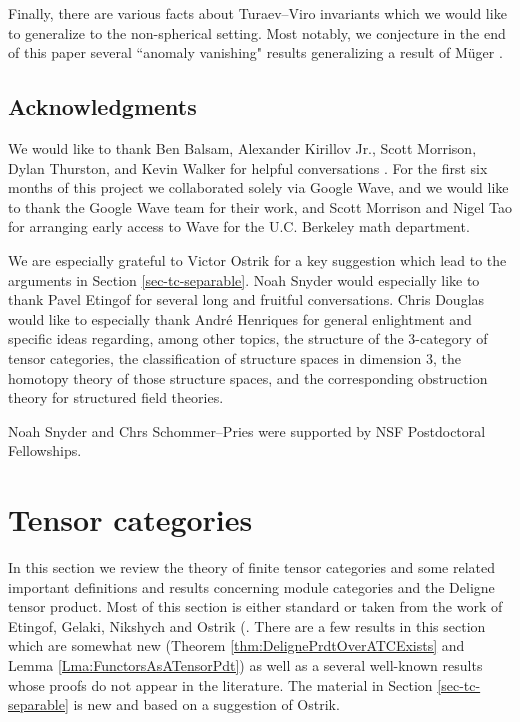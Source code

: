 \documentclass{amsart}
\begin{document}
Finally, there are various facts about Turaev--Viro invariants which we would like to generalize to the non-spherical setting.  Most notably, we conjecture in the end of this paper several ``anomaly vanishing" results generalizing a result of M\"uger \cite{MR1966525}. 

\subsection*{Acknowledgments}
We would like to thank Ben Balsam, Alexander Kirillov Jr., Scott Morrison, Dylan Thurston, and Kevin Walker for helpful conversations .   For the first six months of this project we collaborated solely via Google Wave, and we would like to thank the Google Wave team for their work, and Scott Morrison and Nigel Tao for arranging early access to Wave for the U.C. Berkeley math department.

We are especially grateful to Victor Ostrik for a key suggestion which lead to the arguments in Section \ref{sec-tc-separable}.  Noah Snyder would especially like to thank Pavel Etingof for several long and fruitful conversations.  Chris Douglas would like to especially thank Andr\'e Henriques for general enlightment and specific ideas regarding, among other topics, the structure of the 3-category of tensor categories, the classification of structure spaces in dimension 3,  the homotopy theory of those structure spaces, and the corresponding obstruction theory for structured field theories.

Noah Snyder and Chrs Schommer--Pries were supported by NSF Postdoctoral Fellowships.  


\section{Tensor categories} \label{sec-tc}


In this section we review the theory of finite tensor categories and some related important definitions and results concerning module categories and the Deligne tensor product.  Most of this section is either standard or taken from the work of Etingof, Gelaki, Nikshych and Ostrik (\cite{MR1976459,MR2183279,MR2097289, 0909.3140, EGNO}.  There are a few results in this section which are somewhat new (Theorem \ref{thm:DelignePrdtOverATCExists} and Lemma \ref{Lma:FunctorsAsATensorPdt}) as well as a several well-known results whose proofs do not appear in the literature. The material in Section \ref{sec-tc-separable} is new and based on a suggestion of Ostrik.
\end{document}
